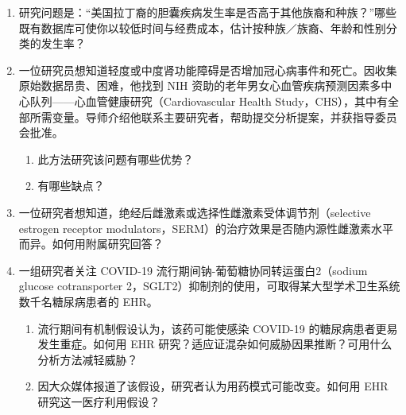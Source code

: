 \begin{enumerate}
\item 研究问题是：“美国拉丁裔的胆囊疾病发生率是否高于其他族裔和种族？”哪些既有数据库可使你以较低时间与经费成本，估计按种族／族裔、年龄和性别分类的发生率？
\item 一位研究员想知道轻度或中度肾功能障碍是否增加冠心病事件和死亡。因收集原始数据昂贵、困难，他找到 NIH 资助的老年男女心血管疾病预测因素多中心队列——心血管健康研究（Cardiovascular Health Study，CHS），其中有全部所需变量。导师介绍他联系主要研究者，帮助提交分析提案，并获指导委员会批准。
\begin{enumerate}\item 此方法研究该问题有哪些优势？\item 有哪些缺点？\end{enumerate}
\item 一位研究者想知道，绝经后雌激素或选择性雌激素受体调节剂（selective estrogen receptor modulators，SERM）的治疗效果是否随内源性雌激素水平而异。如何用附属研究回答？
\item 一组研究者关注 COVID-19 流行期间钠-葡萄糖协同转运蛋白2（sodium glucose cotransporter 2，SGLT2）抑制剂的使用，可取得某大型学术卫生系统数千名糖尿病患者的 EHR。
\begin{enumerate}
\item 流行期间有机制假设认为，该药可能使感染 COVID-19 的糖尿病患者更易发生重症。如何用 EHR 研究？适应证混杂如何威胁因果推断？可用什么分析方法减轻威胁？
\item 因大众媒体报道了该假设，研究者认为用药模式可能改变。如何用 EHR 研究这一医疗利用假设？
\end{enumerate}
\end{enumerate}
